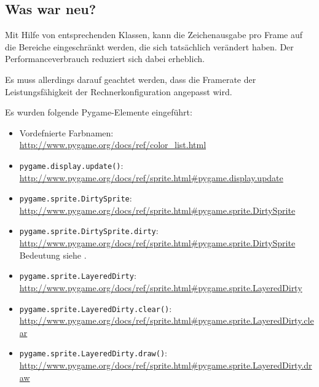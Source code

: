 \subsection*{Was war neu?}

Mit Hilfe von entsprechenden Klassen, kann die Zeichenausgabe pro Frame auf die Bereiche eingeschränkt werden, die sich tatsächlich verändert haben. Der Performanceverbrauch reduziert sich dabei erheblich. 

Es muss allerdings darauf geachtet werden, dass die Framerate der Leistungsfähigkeit der Rechnerkonfiguration angepasst wird. 

Es wurden folgende Pygame-Elemente eingeführt:
\begin{itemize}
	\item Vordefnierte Farbnamen:\\ 
	\url{http://www.pygame.org/docs/ref/color_list.html}

	\item\texttt{pygame.display.update()}:
	\\ \url{http://www.pygame.org/docs/ref/sprite.html#pygame.display.update}

	\item\texttt{pygame.sprite.DirtySprite}:
	\\ \url{http://www.pygame.org/docs/ref/sprite.html#pygame.sprite.DirtySprite}

	\item\texttt{pygame.sprite.DirtySprite.dirty}:
	\\ \url{http://www.pygame.org/docs/ref/sprite.html#pygame.sprite.DirtySprite}\\
	Bedeutung siehe .

	\item \texttt{pygame.sprite.LayeredDirty}:
	\\ \url{http://www.pygame.org/docs/ref/sprite.html#pygame.sprite.LayeredDirty}
	
	\item \texttt{pygame.sprite.LayeredDirty.clear()}:
	\\ \url{http://www.pygame.org/docs/ref/sprite.html#pygame.sprite.LayeredDirty.clear}
	
	\item \texttt{pygame.sprite.LayeredDirty.draw()}:
	\\ \url{http://www.pygame.org/docs/ref/sprite.html#pygame.sprite.LayeredDirty.draw}


\end{itemize}
